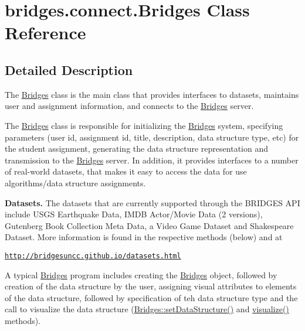 \hypertarget{classbridges_1_1connect_1_1_bridges}{}\section{bridges.\+connect.\+Bridges Class Reference}
\label{classbridges_1_1connect_1_1_bridges}


\subsection{Detailed Description}
The \hyperlink{classbridges_1_1connect_1_1_bridges}{Bridges} class is the main class that provides interfaces to datasets, maintains user and assignment information, and connects to the \hyperlink{classbridges_1_1connect_1_1_bridges}{Bridges} server. 

The \hyperlink{classbridges_1_1connect_1_1_bridges}{Bridges} class is responsible for initializing the \hyperlink{classbridges_1_1connect_1_1_bridges}{Bridges} system, specifying parameters (user id, assignment id, title, description, data structure type, etc) for the student assignment, generating the data structure representation and transmission to the \hyperlink{classbridges_1_1connect_1_1_bridges}{Bridges} server. In addition, it provides interfaces to a number of real-\/world datasets, that makes it easy to access the data for use algorithms/data structure assignments. ~\newline


{\bfseries Datasets.} The datasets that are currently supported through the B\+R\+I\+D\+G\+ES A\+PI include U\+S\+GS Earthquake Data, I\+M\+DB Actor/\+Movie Data (2 versions), Gutenberg Book Collection Meta Data, a Video Game Dataset and Shakespeare Dataset. More information is found in the respective methods (below) and at 

\href{http://bridgesuncc.github.io/datasets.html}{\tt http\+://bridgesuncc.\+github.\+io/datasets.\+html} 

A typical \hyperlink{classbridges_1_1connect_1_1_bridges}{Bridges} program includes creating the \hyperlink{classbridges_1_1connect_1_1_bridges}{Bridges} object, followed by creation of the data structure by the user, assigning visual attributes to elements of the data structure, followed by specification of teh data structure type and the call to visualize the data structure (\hyperlink{classbridges_1_1connect_1_1_bridges_a921a6603b2445b1abe30a1b3d6f0c255}{Bridges\+::set\+Data\+Structure()} and \hyperlink{classbridges_1_1connect_1_1_bridges_a1853d64ffb8675ba2ec227a2b819cd24}{visualize()} methods).

